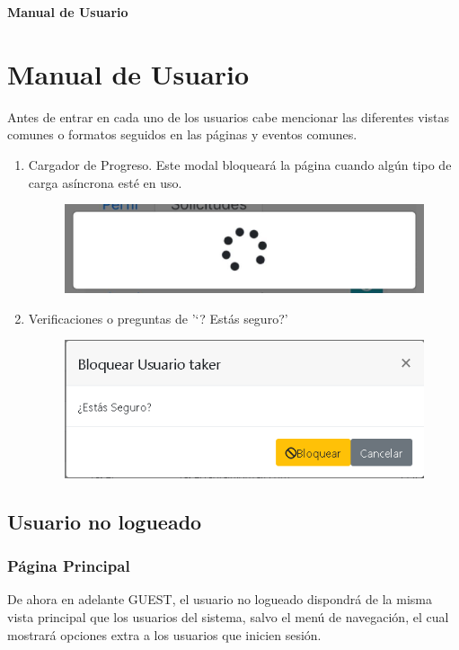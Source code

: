 \newpage{\pagestyle{empty}\cleardoublepage}
\newpage
\vspace*{\fill}
    \begin{center}
      \thispagestyle{empty} \vspace*{0cm} \textbf{\huge
Manual de Usuario}
    \end{center}
    \vspace*{\fill}
\newpage{\pagestyle{empty}\cleardoublepage}
\chapter{Manual de Usuario}

Antes de entrar en cada uno de los usuarios cabe mencionar las diferentes vistas comunes o formatos seguidos en las p\'{a}ginas y eventos comunes.

\begin{enumerate}
\item Cargador de Progreso. Este modal bloquear\'{a} la p\'{a}gina cuando alg\'{u}n tipo de carga as\'{i}ncrona est\'{e} en uso.
\begin{figure}[h!]
\centering
\includegraphics[width=.3\textwidth]{Img/ManualUsuario/PROGRESS_SPINNER.png}
\end{figure}
\item Verificaciones o preguntas de '`? Est\'{a}s seguro?'
\begin{figure}[h!]
\centering
\includegraphics[width=.6\textwidth]{Img/ManualUsuario/ADMIN_BLOCK_USER.png}
\end{figure}
\end{enumerate}


\section{Usuario no logueado}
\subsection{P\'{a}gina Principal}
De ahora en adelante GUEST, el usuario no logueado dispondr\'{a} de la misma vista principal que los usuarios del sistema, salvo el men\'{u} de navegaci\'{o}n, el cual mostrar\'{a} opciones extra a los usuarios que inicien sesi\'{o}n.\\

